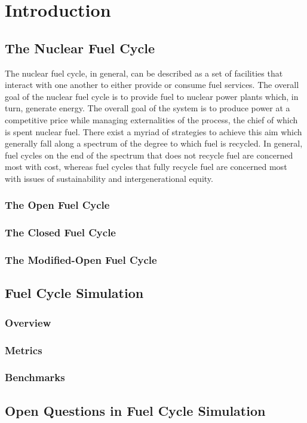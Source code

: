 \chapter{Introduction}\label{ch:intro}

\section{The Nuclear Fuel Cycle}

The nuclear fuel cycle, in general, can be described as a set of facilities that
interact with one another to either provide or consume fuel services. The
overall goal of the nuclear fuel cycle is to provide fuel to nuclear power
plants which, in turn, generate energy. The overall goal of the system is to
produce power at a competitive price while managing externalities of the
process, the chief of which is spent nuclear fuel. There exist a myriad of
strategies to achieve this aim which generally fall along a spectrum of the
degree to which fuel is recycled. In general, fuel cycles on the end of the
spectrum that does not recycle fuel are concerned most with cost, whereas fuel
cycles that fully recycle fuel are concerned most with issues of sustainability
and intergenerational equity.

\subsection{The Open Fuel Cycle}


\subsection{The Closed Fuel Cycle}


\subsection{The Modified-Open Fuel Cycle}


\section{Fuel Cycle Simulation}

\subsection{Overview}\label{sec:simulators-overview}


\subsection{Metrics}


\subsection{Benchmarks}\label{sec:intro-benchmarks}


\section{Open Questions in Fuel Cycle Simulation}

